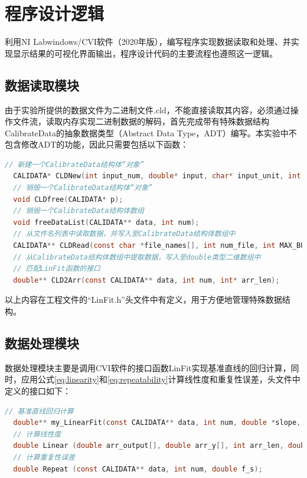 \documentclass[a4paper,12pt,twoside]{article}%
\begin{document}
\section{程序设计逻辑}
利用NI Labwindows/CVI软件（2020年版），编写程序实现数据读取和处理、并实现显示结果的可视化界面输出，程序设计代码的主要流程也遵照这一逻辑。
\subsection{数据读取模块}
由于实验所提供的数据文件为二进制文件.cld，不能直接读取其内容，必须通过操作文件流，读取内存实现二进制数据的解码，首先完成带有特殊数据结构CalibrateData的抽象数据类型（Abstract Data Type，ADT）编写。本实验中不包含修改ADT的功能，因此只需要包括以下函数：
\begin{lstlisting}[language=C]
  // 新建一个CalibrateData结构体“对象”
  CALIDATA* CLDNew(int input_num, double* input, char* input_unit, int loop_num, char* output_unit, double* output);
  // 销毁一个CalibrateData结构体“对象”
  void CLDfree(CALIDATA* p);
  // 销毁一个CalibrateData结构体数组
  void freeDataList(CALIDATA** data, int num);
  // 从文件名列表中读取数据，并写入至CalibrateData结构体数组中
  CALIDATA** CLDRead(const char *file_names[], int num_file, int MAX_BUFFER);
  // 从CalibrateData结构体数组中提取数据，写入至double类型二维数组中
  // 匹配LinFit函数的接口
  double** CLD2Arr(const CALIDATA** data, int num, int* arr_len);
\end{lstlisting}\par
以上内容在工程文件的“LinFit.h”头文件中有定义，用于方便地管理特殊数据结构。
\subsection{数据处理模块}
数据处理模块主要是调用CVI软件的接口函数LinFit实现基准直线的回归计算，同时，应用公式\ref{eq:linearity}和\ref{eq:repeatability}计算线性度和重复性误差，头文件中定义的接口如下：
\begin{lstlisting}[language=C]
  // 基准直线回归计算
  double** my_LinearFit(const CALIDATA** data, int num, double *slope, double *intercept, double *meanSquaredError, double *linear, double *repeat, int *arr_len);
  // 计算线性度
  double Linear (double arr_output[], double arr_y[], int arr_len, double f_s);
  // 计算重复性误差
  double Repeat (const CALIDATA** data, int num, double f_s);
\end{lstlisting}
\end{document}

